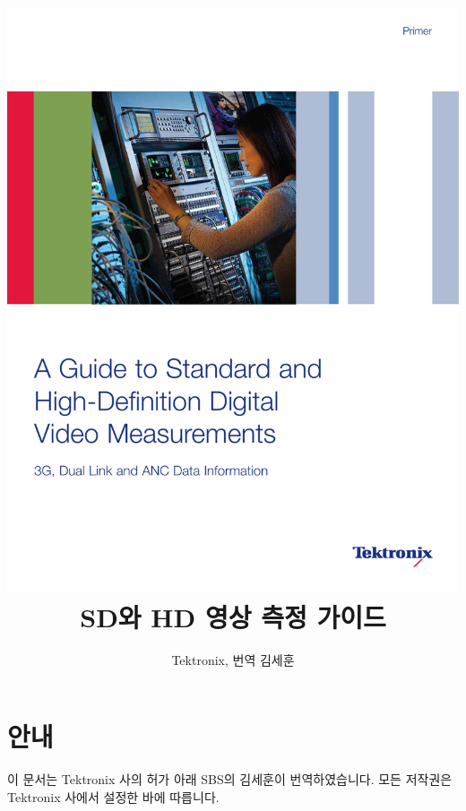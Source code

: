 \documentclass[10pt,twocolumn]{book}
\title{\includegraphics[width=15cm]{cover.pdf} \\SD와 HD 영상 측정 가이드}
\author{Tektronix, 번역 김세훈}
\begin{document}
\maketitle
\tableofcontents

\onecolumn
\section{안내}
이 문서는 Tektronix 사의 허가 아래 SBS의 김세훈이 번역하였습니다. 모든 저작권은 Tektronix 사에서 설정한 바에 따릅니다.

\twocolumn





















\printindex
\end{document}
